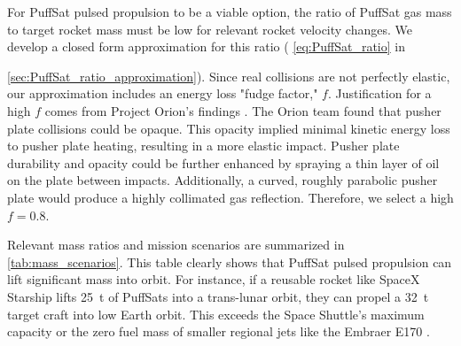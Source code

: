 \documentclass{article}
\begin{document}
For PuffSat pulsed propulsion to be a viable option, the ratio of PuffSat gas mass to target rocket mass must be low for relevant rocket velocity changes. We develop a closed form approximation for this ratio ( \autoref{eq:PuffSat_ratio} in {\autoref{sec:PuffSat_ratio_approximation}). Since real collisions are not perfectly elastic, our approximation includes an energy loss "fudge factor," $f$.  Justification for a high $f$ comes from Project Orion's findings \cite{orion_reflections}.   The Orion team found that pusher plate collisions could be opaque. This opacity implied minimal kinetic energy loss to pusher plate heating, resulting in a more elastic impact. Pusher plate durability and opacity could be further enhanced by spraying a thin layer of oil on the plate between impacts.   Additionally, a curved, roughly parabolic pusher plate would produce a  highly collimated gas reflection. Therefore, we select a high  $f=0.8$.   

Relevant mass ratios and mission scenarios are summarized in \autoref{tab:mass_scenarios}. This table clearly shows that PuffSat pulsed propulsion can lift significant mass into orbit. For instance, if a reusable rocket like SpaceX Starship \cite{starship} lifts \SI{25}{\tonne} of PuffSats into a trans-lunar orbit, they can propel a  \SI{32}{\tonne} target craft into low Earth orbit. This exceeds the Space Shuttle's maximum capacity \cite{space_shuttle_program} or the zero fuel mass of smaller regional jets like the Embraer E170 \cite{embraer_e170}.

}
\end{document}
